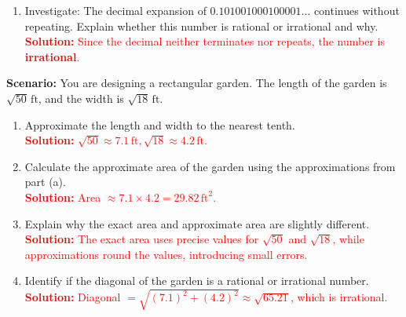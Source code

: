 \documentclass[10pt]{article}
\begin{document}
\begin{tcolorbox}[colframe=black!60, colback=white, 
coltitle=black, colbacktitle=black!15, fonttitle=\bfseries\Large, 
title=Problems, halign title=center, left=10pt, right=10pt, top=10pt, bottom=60pt]
\begin{enumerate}[start=8, itemsep=1em]
    \item Investigate: The decimal expansion of \( 0.101001000100001\ldots \) continues without repeating. Explain whether this number is rational or irrational and why.\\
    \textcolor{red}{\textbf{Solution:} Since the decimal neither terminates nor repeats, the number is \textbf{irrational}.}
\end{enumerate}
\end{tcolorbox}

\vspace{1em}

\begin{tcolorbox}[colframe=black!60, colback=white, 
coltitle=black, colbacktitle=black!15, fonttitle=\bfseries\Large, 
title=Performance Task: Estimating Square Roots, halign title=center, left=10pt, right=10pt, top=10pt, bottom=100pt]
\textbf{Scenario:} You are designing a rectangular garden. The length of the garden is \( \sqrt{50} \, \text{ft} \), and the width is \( \sqrt{18} \, \text{ft} \).
\begin{enumerate}[itemsep=5em]
    \item Approximate the length and width to the nearest tenth.\\
    \textcolor{red}{\textbf{Solution:} $ \sqrt{50} \approx 7.1 \, \text{ft}, \sqrt{18} \approx 4.2 \, \text{ft}. $ } 

    \item Calculate the approximate area of the garden using the approximations from part (a).\\
    \textcolor{red}{\textbf{Solution:} Area \( \approx 7.1 \times 4.2 = 29.82 \, \text{ft}^2\).}

    \item Explain why the exact area and approximate area are slightly different.\\
    \textcolor{red}{\textbf{Solution:} The exact area uses precise values for \( \sqrt{50} \) and \( \sqrt{18} \), while approximations round the values, introducing small errors.}

    \item Identify if the diagonal of the garden is a rational or irrational number.\\
    \textcolor{red}{\textbf{Solution:} Diagonal \( = \sqrt{(7.1)^2 + (4.2)^2} \approx \sqrt{65.21} \), which is irrational.}
\end{enumerate}
\end{tcolorbox}
\end{document}

